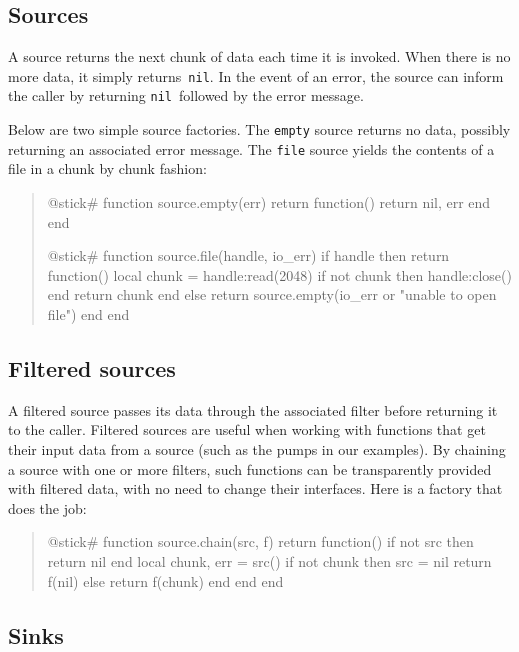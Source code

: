 \documentclass[10pt]{article}
\newcommand{\nil}{\texttt{nil}}
\begin{document}
\subsection{Sources}

A source returns the next chunk of data each time it is
invoked. When there is no more data, it simply returns~\nil.
In the event of an error, the source can inform the
caller by returning \nil\ followed by the error message.

Below are two simple source factories. The \texttt{empty} source
returns no data, possibly returning an associated error
message. The \texttt{file} source yields the contents of a file
in a chunk by chunk fashion:
\begin{quote}
\begin{lua}
@stick#
function source.empty(err)
  return function()
    return nil, err
  end
end
%

@stick#
function source.file(handle, io_err)
  if handle then
    return function()
      local chunk = handle:read(2048)
      if not chunk then handle:close() end
      return chunk
    end
  else return source.empty(io_err or "unable to open file") end
end
%
\end{lua}
\end{quote}

\subsection{Filtered sources}

A filtered source passes its data through the
associated filter before returning it to the caller.
Filtered sources are useful when working with
functions that get their input data from a source (such as
the pumps in our examples). By chaining a source with one or
more filters, such functions can be transparently provided
with filtered data, with no need to change their interfaces.
Here is a factory that does the job:
\begin{quote}
\begin{lua}
@stick#
function source.chain(src, f)
  return function()
    if not src then
      return nil
    end
    local chunk, err = src()
    if not chunk then
      src = nil
      return f(nil)
    else
      return f(chunk)
    end
  end
end
%
\end{lua}
\end{quote}

\subsection{Sinks}
\end{document}
